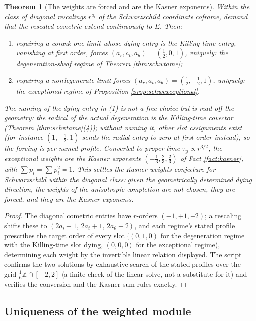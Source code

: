 \documentclass[11pt]{article}
\newtheorem{theorem}{Theorem}[section]
\theoremstyle{definition}
\begin{document}
\begin{theorem}[The weights are forced and are the Kasner exponents]\label{thm:weights}
Within the class of diagonal rescalings $r^{a_i}$ of the Schwarzschild coordinate coframe, demand that the rescaled cometric extend continuously to $E$. Then:
\begin{enumerate}
\item requiring a corank-one limit whose dying entry is the Killing-time entry, vanishing at first order, forces $(a_r, a_t, a_\theta) = (\tfrac12, 0, 1)$, uniquely: the degeneration-sheaf regime of Theorem \ref{thm:schwtame};
\item requiring a nondegenerate limit forces $(a_r, a_t, a_\theta) = (\tfrac12, -\tfrac12, 1)$, uniquely: the exceptional regime of Proposition \ref{prop:schwexceptional}.
\end{enumerate}
The naming of the dying entry in (1) is not a free choice but is read off the geometry: the radical of the actual degeneration is the Killing-time covector (Theorem \ref{thm:schwtame}(4)); without naming it, other slot assignments exist (for instance $(1, -\tfrac12, 1)$ sends the radial entry to zero at first order instead), so the forcing is per named profile. Converted to proper time $\tau_{\mathrm{p}} \propto r^{3/2}$, the exceptional weights are the Kasner exponents $(-\tfrac13, \tfrac23, \tfrac23)$ of Fact \ref{fact:kasner}, with $\sum p_i = \sum p_i^2 = 1$. This settles the Kasner-weights conjecture for Schwarzschild within the diagonal class: given the geometrically determined dying direction, the weights of the anisotropic completion are not chosen, they are forced, and they are the Kasner exponents.
\end{theorem}

\begin{proof}
The diagonal cometric entries have $r$-orders $(-1, +1, -2)$; a rescaling shifts these to $(2a_r - 1,\, 2a_t + 1,\, 2a_\theta - 2)$, and each regime's stated profile prescribes the target order of every slot ($(0, 1, 0)$ for the degeneration regime with the Killing-time slot dying, $(0,0,0)$ for the exceptional regime), determining each weight by the invertible linear relation displayed. The script confirms the two solutions by exhaustive search of the stated profiles over the grid $\tfrac16\mathbb{Z} \cap [-2,2]$ (a finite check of the linear solve, not a substitute for it) and verifies the conversion and the Kasner sum rules exactly.
\end{proof}

\subsection{Uniqueness of the weighted module}\label{subsec:uniqueness}
\end{document}
